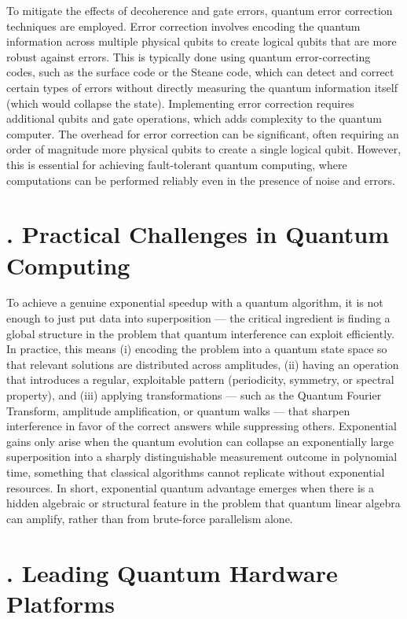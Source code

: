 \documentclass{elbioimp2}
\begin{document}
To mitigate the effects of decoherence and gate errors, quantum error correction techniques are employed. Error correction involves encoding the quantum information across multiple physical qubits to create logical qubits that are more robust against errors. This is typically done using quantum error-correcting codes, such as the surface code or the Steane code, which can detect and correct certain types of errors without directly measuring the quantum information itself (which would collapse the state). Implementing error correction requires additional qubits and gate operations, which adds complexity to the quantum computer. The overhead for error correction can be significant, often requiring an order of magnitude more physical qubits to create a single logical qubit. However, this is essential for achieving fault-tolerant quantum computing, where computations can be performed reliably even in the presence of noise and errors.


\section{. Practical Challenges in Quantum Computing}
To achieve a genuine exponential speedup with a quantum algorithm, it is not enough to just put data into superposition — 
the critical ingredient is finding a global structure in the problem that quantum interference can exploit efficiently. In practice, this means (i) encoding the 
problem into a quantum state space so that relevant solutions are distributed across amplitudes, (ii) having an operation that introduces a regular, 
exploitable pattern (periodicity, symmetry, or spectral property), and (iii) applying transformations — such as the Quantum Fourier Transform, amplitude amplification, 
or quantum walks — that sharpen interference in favor of the correct answers while suppressing others. Exponential gains only arise when the quantum evolution can 
collapse an exponentially large superposition into a sharply distinguishable measurement outcome in polynomial time, something that classical algorithms cannot 
replicate without exponential resources. In short, exponential quantum advantage emerges when there is a hidden algebraic or structural feature in the problem that 
quantum linear algebra can amplify, rather than from brute-force parallelism alone.

\section{. Leading Quantum Hardware Platforms}
\end{document}

